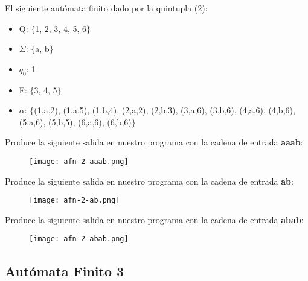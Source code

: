 El siguiente autómata finito dado por la quintupla (2):

\begin{itemize}
\item Q: $\{$1, 2, 3, 4, 5, 6$\}$
\item $\Sigma$: $\{$a, b$\}$
\item $q_{0}$: 1
\item F: $\{$3, 4, 5$\}$
\item $\alpha$: $\{$(1,a,2), (1,a,5), (1,b,4), (2,a,2), (2,b,3), (3,a,6), (3,b,6), (4,a,6), (4,b,6), (5,a,6), (5,b,5), (6,a,6), (6,b,6)$\}$
\end{itemize}

Produce la siguiente salida en nuestro programa con la cadena de entrada \textbf{aaab}:

\begin{figure}[H]
\texttt{[image: afn-2-aaab.png]}
\centering \linebreak {}
\end{figure} 

Produce la siguiente salida en nuestro programa con la cadena de entrada \textbf{ab}:

\begin{figure}[H]
\texttt{[image: afn-2-ab.png]}
\centering \linebreak {}
\end{figure} 

Produce la siguiente salida en nuestro programa con la cadena de entrada \textbf{abab}:

\begin{figure}[H]
\texttt{[image: afn-2-abab.png]}
\centering \linebreak {}
\end{figure} 

\subsection{Autómata Finito 3}

